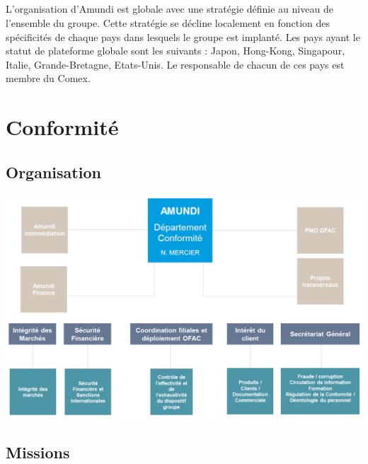 \documentclass[12pt,a4paper]{report}
\begin{document}
\subsection*{}
L'organisation d'Amundi est globale avec une stratégie définie au niveau de l’ensemble du groupe. Cette stratégie se décline localement en fonction des spécificités de chaque pays dans lesquels le groupe est implanté. Les pays ayant le statut de plateforme globale sont les suivants : Japon, Hong-Kong, Singapour, Italie, Grande-Bretagne, Etats-Unis. Le responsable de chacun de ces pays est membre du Comex.
\section{\textbf{ Conformité}}
\subsection{Organisation}
\includegraphics[scale=0.7]{IMG/cpl.png}
\subsection{Missions} 
\end{document}
